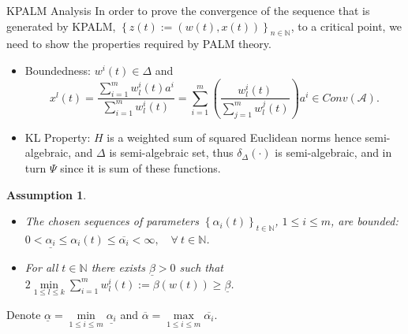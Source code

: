 \documentclass[9pt,handout]{beamer} %
\newtheorem{assumption}{Assumption}
\newcommand{\nn}{\mathbb{N}} %
\begin{document}
	\begin{frame}{KPALM Analysis}
		In order to prove the convergence of the sequence that is generated by KPALM, $\left\{ z(t):=(w(t),x(t)) \right\}_{n \in \nn}$, to a critical point, we need to show the properties required by PALM theory.
		\pause
		\begin{itemize}[<+->]
			\item Boundedness: $w^i(t) \in \Delta$ and 
				\begin{equation*}
					x^l(t) = \frac{\sum_{i=1}^{m} w^i_l(t) a^i}{\sum_{i=1}^{m} w^i_l(t)} 
					= \sum_{i=1}^{m} \left( \frac{ w^i_l(t)}{\sum_{j=1}^{m} w^j_l(t)} \right) a^i \in Conv(\mathcal{A}).
				\end{equation*}
			\item KL Property: $H$ is a weighted sum of squared Euclidean norms hence semi-algebraic, and $\Delta$ is semi-algebraic set, thus $\delta_{\Delta}(\cdot)$ is semi-algebraic, and in turn $\Psi$ since it is sum of these functions.
		\end{itemize}
		\pause
		\begin{assumption} \label{AssumptionsB}
            \begin{itemize}
                \item[$\rm{(i)}$] The chosen sequences of parameters $\left\{ \alpha_i(t) \right\}_{t \in \nn}$, $1 \leq i \leq m$, are bounded: $0 < \underline{\alpha_i} \leq \alpha_i(t) \leq \overline{\alpha_i} < \infty, \quad \forall \: t \in \nn$.
                \item[$\rm{(ii)}$] For all $t \in \mathbb{N}$ there exists $\underline{\beta} > 0$ such that $2\min\limits_{1 \leq l \leq k} \sum\limits_{i=1}^{m} w^i_l(t) := \beta(w(t)) \geq \underline{\beta}$.
            \end{itemize}
        \end{assumption}
        \pause
        Denote $\underline{\alpha}=\min\limits_{1 \leq i \leq m} \underline{\alpha_i}$ and $\overline{\alpha}=\max\limits_{1 \leq i \leq m} \overline{\alpha_i}$.
	\end{frame}
	
\end{document}
